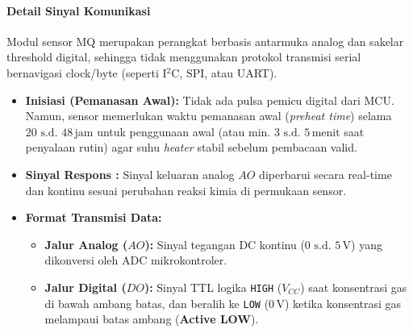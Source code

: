 \paragraph{Detail Sinyal Komunikasi}
Modul sensor MQ merupakan perangkat berbasis antarmuka analog dan sakelar threshold digital, sehingga tidak menggunakan protokol transmisi serial bernavigasi clock/byte (seperti I$^2$C, SPI, atau UART).

\begin{itemize}
	\item \textbf{Inisiasi (Pemanasan Awal):} Tidak ada pulsa pemicu digital dari MCU. Namun, sensor memerlukan waktu pemanasan awal (\textit{preheat time}) selama $20\text{ s.d. }48\,\text{jam}$ untuk penggunaan awal (atau min. $3\text{ s.d. }5\,\text{menit}$ saat penyalaan rutin) agar suhu \textit{heater} stabil sebelum pembacaan valid.
	\item \textbf{Sinyal Respons :} Sinyal keluaran analog $AO$ diperbarui secara real-time dan kontinu sesuai perubahan reaksi kimia di permukaan sensor.
	\item \textbf{Format Transmisi Data:}
	      \begin{itemize}
		      \item \textbf{Jalur Analog ($AO$):} Sinyal tegangan DC kontinu ($0\text{ s.d. }5\,\text{V}$) yang dikonversi oleh ADC mikrokontroler.
		      \item \textbf{Jalur Digital ($DO$):} Sinyal TTL logika \texttt{HIGH} ($V_{CC}$) saat konsentrasi gas di bawah ambang batas, dan beralih ke \texttt{LOW} ($0\,\text{V}$) ketika konsentrasi gas melampaui batas ambang (\textbf{Active LOW}).
	      \end{itemize}

\end{itemize}

